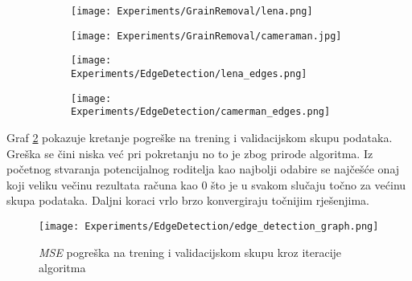 \begin{figure}
	\centering
	\caption{Fotografije Lene i Kamermana prije i nakon detekcije rubova}
	\begin{subfigure}[t]{0.48\textwidth}
		\texttt{[image: Experiments/GrainRemoval/lena.png]}
	\end{subfigure}
	\begin{subfigure}[t]{0.48\textwidth}
		\texttt{[image: Experiments/GrainRemoval/cameraman.jpg]}
	\end{subfigure}
	\begin{subfigure}[t]{0.48\textwidth}
		\texttt{[image: Experiments/EdgeDetection/lena\_edges.png]}
	\end{subfigure}
	\begin{subfigure}[t]{0.48\textwidth}
		\texttt{[image: Experiments/EdgeDetection/camerman\_edges.png]}
	\end{subfigure}
	\label{fig:edge_detection_results}
\end{figure}

Graf \ref{fig:edge_detection_graph} pokazuje kretanje pogreške na trening i validacijskom skupu podataka.
Greška se čini niska već pri pokretanju no to je zbog prirode algoritma.
Iz početnog stvaranja potencijalnog roditelja kao najbolji odabire se najčešće onaj koji veliku večinu rezultata računa kao $0$ što je u svakom slučaju točno za većinu skupa podataka.
Daljni koraci vrlo brzo konvergiraju točnijim rješenjima.

\begin{figure}
	\centering
	\caption{\emph{MSE} pogreška na trening i validacijskom skupu kroz iteracije algoritma}
	\texttt{[image: Experiments/EdgeDetection/edge\_detection\_graph.png]}
	\label{fig:edge_detection_graph}
\end{figure}
